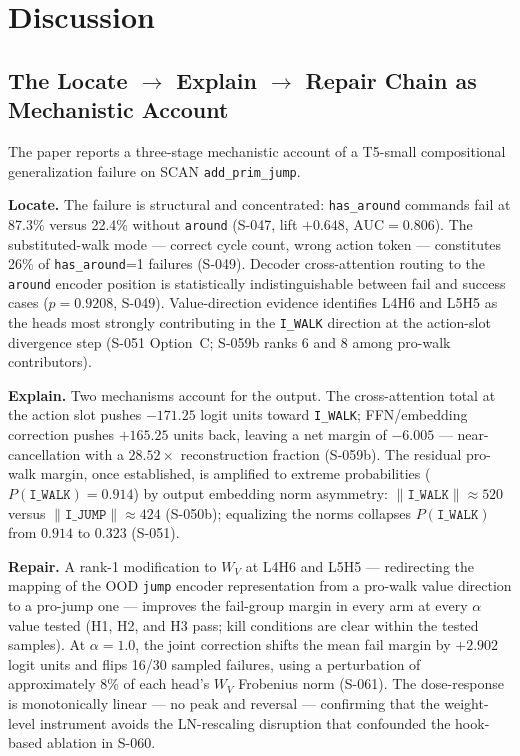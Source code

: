 \section{Discussion}
\label{sec:discussion}

\subsection{\texorpdfstring{The Locate $\to$ Explain $\to$ Repair Chain as Mechanistic Account}{The Locate to Explain to Repair Chain as Mechanistic Account}}

The paper reports a three-stage mechanistic account of a T5-small compositional
generalization failure on SCAN \texttt{add\_prim\_jump}.

\textbf{Locate.}
The failure is structural and concentrated: \texttt{has\_around} commands fail at 87.3\%
versus 22.4\% without \texttt{around} (S-047, lift $+0.648$, AUC$=0.806$).
The substituted-walk mode --- correct cycle count, wrong action token --- constitutes
26\% of \texttt{has\_around}=1 failures (S-049).
Decoder cross-attention routing to the \texttt{around} encoder position is statistically
indistinguishable between fail and success cases ($p=0.9208$, S-049).
Value-direction evidence identifies L4H6 and L5H5 as the heads most strongly
contributing in the \texttt{I\_WALK} direction at the action-slot divergence step
(S-051 Option~C; S-059b ranks 6 and 8 among pro-walk contributors).

\textbf{Explain.}
Two mechanisms account for the output.
The cross-attention total at the action slot pushes $-171.25$ logit units toward
\texttt{I\_WALK}; FFN/embedding correction pushes $+165.25$ units back, leaving a
net margin of $-6.005$ --- near-cancellation with a $28.52\times$ reconstruction
fraction (S-059b).
The residual pro-walk margin, once established, is amplified to extreme probabilities
($P(\texttt{I\_WALK})=0.914$) by output embedding norm asymmetry:
$\|\texttt{I\_WALK}\|\approx 520$ versus $\|\texttt{I\_JUMP}\|\approx 424$ (S-050b);
equalizing the norms collapses $P(\texttt{I\_WALK})$ from $0.914$ to $0.323$ (S-051).

\textbf{Repair.}
A rank-1 modification to $W_V$ at L4H6 and L5H5 --- redirecting the mapping of the OOD
\texttt{jump} encoder representation from a pro-walk value direction to a pro-jump one ---
improves the fail-group margin in every arm at every $\alpha$ value tested (H1, H2, and H3
pass; kill conditions are clear within the tested samples).
At $\alpha=1.0$, the joint correction shifts the mean fail margin by $+2.902$ logit units
and flips 16/30 sampled failures, using a perturbation of approximately 8\% of each
head's $W_V$ Frobenius norm (S-061).
The dose-response is monotonically linear --- no peak and reversal --- confirming that
the weight-level instrument avoids the LN-rescaling disruption that confounded the
hook-based ablation in S-060.


